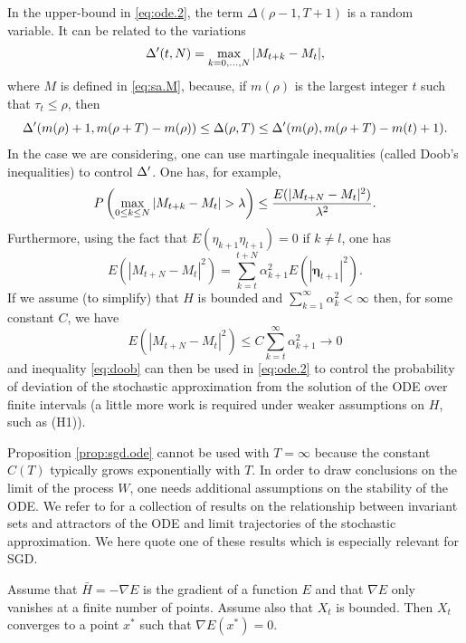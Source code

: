 In the upper-bound in \cref{eq:ode.2}, the term $\Delta(\rho-1, T+1)$ is a random variable. It can be related to the variations
\[
\Delta'(t, N) = \max_{k = 0, \ldots, N}  |M_{t+k} - M_t|, 
\]
where $M$ is defined in \eqref{eq:sa.M},
because, if $m(\rho)$ is the largest integer $t$ such that $\tau_t \leq \rho$, then
\[
\Delta'(m(\rho)+1, m(\rho+T) - m(\rho)) \leq \Delta(\rho, T) \leq  \Delta'(m(\rho), m(\rho+T) - m(t)+1).
\]
In the case we are considering, one can use martingale inequalities (called Doob's inequalities) to control $\Delta'$. One has, for example,
\begin{equation}
\label{eq:doob}
P\left(\max_{0\leq k\leq N}|M_{t+k} - M_t| > \lambda\right) \leq \frac{E(|M_{t+N} - M_t|^2)}{\lambda^2}.
\end{equation}
Furthermore, using the fact that $E(\eta_{k+1}\eta_{l+1}) = 0$ if $k\neq l$, one has
\[
E(|M_{t+N} - M_t|^2 )= \sum_{k=t}^{t+N} \alpha_{k+1}^2 E(|\boldsymbol\eta_{t+1}|^2).
\]
If we assume (to simplify) that $H$ is bounded and $\sum_{k=1}^\infty \alpha_k^2 <\infty$ then, for some constant $C$, we have
\[
E(|M_{t+N} - M_t|^2) \leq C \sum_{k=t}^{\infty} \alpha_{k+1}^2 \to 0
\]
and inequality \eqref{eq:doob} can then be used in \eqref{eq:ode.2} to control the probability of deviation of the stochastic approximation from the solution of the ODE over finite intervals (a little more work is required under weaker assumptions on $H$, such as (H1)).
\bigskip

Proposition \ref{prop:sgd.ode} cannot be used with $T = \infty$ because the constant $C(T)$ typically grows exponentially with $T$. In order to draw conclusions on the limit of the process $W$, one needs additional assumptions on the stability of the ODE. We refer to \cite{benaim1999dynamics} for a collection of results on the 
relationship between invariant sets and attractors of the ODE and  limit trajectories of the stochastic approximation. We here quote one of these results which is especially relevant for SGD. 
\begin{proposition}
\label{prop:sgd.conv}
Assume that $\bar H = -\nabla E$ is the gradient of a function $E$ and that $\nabla E$ only vanishes at a finite number of points. Assume also that $X_t$ is bounded. Then $X_t$ converges to a point $x^*$ such that  $\nabla E(x^*) = 0$.
\end{proposition}


